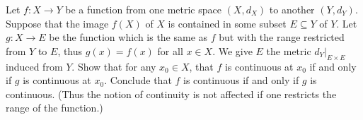 \begin{exercise}\label{ex 2.1.7}
    Let \(f : X \to Y\) be a function from one metric space \((X, d_X)\) to another \((Y, d_Y)\).
    Suppose that the image \(f(X)\) of \(X\) is contained in some subset \(E \subseteq Y\) of \(Y\).
    Let \(g : X \to E\) be the function which is the same as \(f\) but with the range restricted from \(Y\) to \(E\), thus \(g(x) = f(x)\) for all \(x \in X\).
    We give \(E\) the metric \(d_Y|_{E \times E}\) induced from \(Y\).
    Show that for any \(x_0 \in X\), that \(f\) is continuous at \(x_0\) if and only if \(g\) is continuous at \(x_0\).
    Conclude that \(f\) is continuous if and only if \(g\) is continuous.
    (Thus the notion of continuity is not affected if one restricts the range of the function.)
\end{exercise}